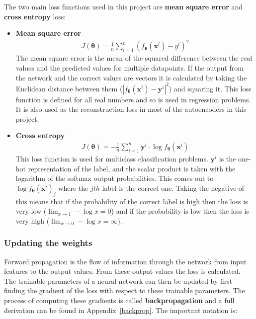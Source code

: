 \documentclass[12pt,a4paper,twoside,openright]{report}
\renewcommand{\vec}[1]{\bm{#1}}
\begin{document}
The two main loss functions used in this project are \textbf{mean square error} and \textbf{cross entropy} loss:
\begin{itemize}
  \item \textbf{Mean square error}
        \begin{align}
          J(\vec{\theta}) = \frac{1}{n}\sum_{i=1}^{n} (f_{\vec{\theta}}(\vec{x}^i) - y^i)^2 \label{eq:mse}
        \end{align}
        The mean square error is the mean of the squared difference between the real values and the 
        predicted values for multiple datapoints. If the output from the network and the correct values are 
        vectors it is calculated by taking the Euclidean distance between them ($|f_{\vec{\theta}}(\vec{x}^i) - \vec{y}^i|^{2}$) 
        and squaring it. This loss function is defined for all real numbers and so is used in regression problems. 
        It is also used as the reconstruction loss in most of the autoencoders in this project.
  \item \textbf{Cross entropy}
        \begin{align}
          J(\vec{\theta}) = - \frac{1}{n}\sum_{i=1}^{n} \vec{y}^i \cdot \log{f_{\vec{\theta}}(\vec{x}^i)} \label{eq:ce}
        \end{align}
        This loss function is used for multiclass classification problems. $\vec{y}^i$ is the one-hot 
        representation of the label, and the scalar product is taken with the logarithm of the softmax output 
        probabilities. This comes out to $\log{f_{\vec{\theta}}(\vec{x}^i)_j}$ where the $jth$ label is the correct one.
        Taking the negative of this means that if the probability of the correct label is high then the loss is 
        very low ($\lim_{x \to 1} -\log{x} = 0$) and if the probability is low then the loss is very high 
        ($\lim_{x \to 0} -\log{x} = \infty$).
\end{itemize}

\subsubsection{Updating the weights}

Forward propagation is the flow of information through the network from input features to the output values. From these output values the loss is calculated. 
The trainable parameters of a neural network can then be updated by first finding the gradient of the loss with respect to these trainable parameters.
The process of computing these gradients is called \textbf{backpropagation} and a full derivation can be found in Appendix~\ref{backprop}. The important notation is:
\end{document}
